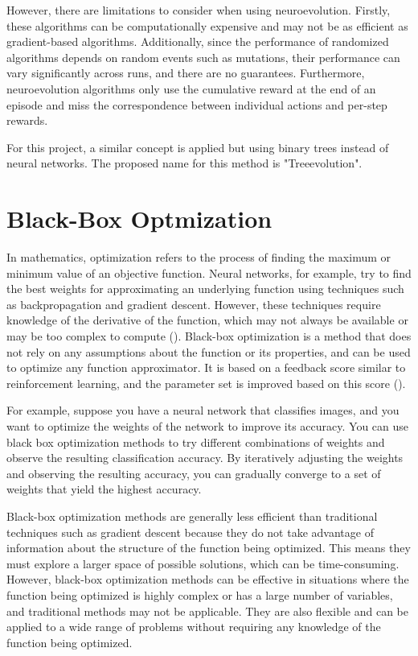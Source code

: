 However, there are limitations to consider when using neuroevolution. Firstly, these algorithms can be computationally expensive and may not be as efficient as gradient-based algorithms. Additionally, since the performance of randomized algorithms depends on random events such as mutations, their performance can vary significantly across runs, and there are no guarantees. Furthermore, neuroevolution algorithms only use the cumulative reward at the end of an episode and miss the correspondence between individual actions and per-step rewards.

For this project, a similar concept is applied but using binary trees instead of neural networks. The proposed name for this method is "Treeevolution".

\section{Black-Box Optmization}

In mathematics, optimization refers to the process of finding the maximum or minimum value of an objective function. Neural networks, for example, try to find the best weights for approximating an underlying function using techniques such as backpropagation and gradient descent. However, these techniques require knowledge of the derivative of the function, which may not always be available or may be too complex to compute (\cite{schaul_studies_nodate}). Black-box optimization is a method that does not rely on any assumptions about the function or its properties, and can be used to optimize any function approximator. It is based on a feedback score similar to reinforcement learning, and the parameter set is improved based on this score (\cite{anderson_introduction_1995}).

For example, suppose you have a neural network that classifies images, and you want to optimize the weights of the network to improve its accuracy. You can use black box optimization methods to try different combinations of weights and observe the resulting classification accuracy. By iteratively adjusting the weights and observing the resulting accuracy, you can gradually converge to a set of weights that yield the highest accuracy. 

Black-box optimization methods are generally less efficient than traditional techniques such as gradient descent because they do not take advantage of information about the structure of the function being optimized. This means they must explore a larger space of possible solutions, which can be time-consuming. However, black-box optimization methods can be effective in situations where the function being optimized is highly complex or has a large number of variables, and traditional methods may not be applicable. They are also flexible and can be applied to a wide range of problems without requiring any knowledge of the function being optimized.


